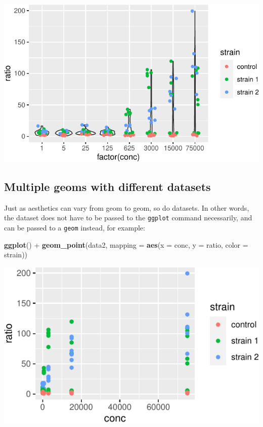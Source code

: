 \documentclass[]{book}
\newenvironment{Shaded}{}{}
\newcommand{\DataTypeTok}[1]{\textcolor[rgb]{0.56,0.13,0.00}{#1}}
\newcommand{\KeywordTok}[1]{\textcolor[rgb]{0.00,0.44,0.13}{\textbf{#1}}}
\newcommand{\NormalTok}[1]{#1}
\newcommand{\OperatorTok}[1]{\textcolor[rgb]{0.40,0.40,0.40}{#1}}
\newcommand{\StringTok}[1]{\textcolor[rgb]{0.25,0.44,0.63}{#1}}
\begin{document}
\begin{center}\includegraphics[width=\textwidth]{TRES-Tidy-Tutorial_files/figure-latex/unnamed-chunk-123-1} \end{center}

\hypertarget{multiple-geoms-with-different-datasets}{%
\subsection{Multiple geoms with different datasets}\label{multiple-geoms-with-different-datasets}}

Just as aesthetics can vary from geom to geom, so do datasets. In other words, the dataset does not have to be passed to the \texttt{ggplot} command necessarily, and can be passed to a \texttt{geom} instead, for example:

\begin{Shaded}
\begin{Highlighting}[]
\KeywordTok{ggplot}\NormalTok{() }\OperatorTok{+}
\StringTok{  }\KeywordTok{geom_point}\NormalTok{(data2, }\DataTypeTok{mapping =} \KeywordTok{aes}\NormalTok{(}\DataTypeTok{x =}\NormalTok{ conc, }\DataTypeTok{y =}\NormalTok{ ratio, }\DataTypeTok{color =}\NormalTok{ strain))}
\end{Highlighting}
\end{Shaded}

\begin{center}\includegraphics[width=\textwidth]{TRES-Tidy-Tutorial_files/figure-latex/unnamed-chunk-124-1} \end{center}
\end{document}
